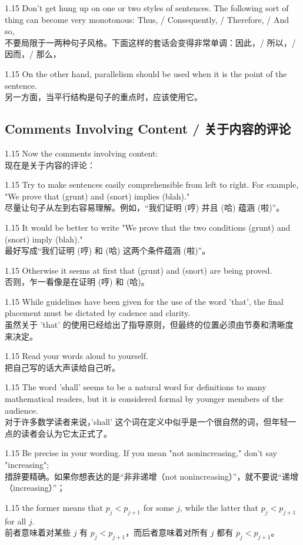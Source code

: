 \documentclass[12pt,a4paper]{article}
\newcommand{\bilingual}[2]{
    \begin{spacing}{1.15} %
        \noindent \normalsize #1 \\[-0.5ex] %
        \small \textcolor{blue!70!black}{#2} %
    \end{spacing}
    \vspace{0.8em} %
}
\begin{document}
\bilingual{Don't get hung up on one or two styles of sentences. The following sort of thing can become very monotonous: Thus, / Consequently, / Therefore, / And so,}
{不要局限于一两种句子风格。下面这样的套话会变得非常单调：因此，/ 所以，/ 因而，/ 那么，} %

\bilingual{On the other hand, parallelism should be used when it is the point of the sentence.}
{另一方面，当平行结构是句子的重点时，应该使用它。} %

\subsection*{Comments Involving Content / 关于内容的评论} %

\bilingual{Now the comments involving content:}
{现在是关于内容的评论：} %

\bilingual{Try to make sentences easily comprehensible from left to right. For example, "We prove that (grunt) and (snort) implies (blah)."}
{尽量让句子从左到右容易理解。例如，“我们证明 (哼) 并且 (哈) 蕴涵 (啦)”。} %

\bilingual{It would be better to write "We prove that the two conditions (grunt) and (snort) imply (blah)."}
{最好写成“我们证明 (哼) 和 (哈) 这两个条件蕴涵 (啦)”。} %

\bilingual{Otherwise it seems at first that (grunt) and (snort) are being proved.}
{否则，乍一看像是在证明 (哼) 和 (哈)。} %

\bilingual{While guidelines have been given for the use of the word 'that', the final placement must be dictated by cadence and clarity.}
{虽然关于 'that' 的使用已经给出了指导原则，但最终的位置必须由节奏和清晰度来决定。} %

\bilingual{Read your words aloud to yourself.}
{把自己写的话大声读给自己听。} %

\bilingual{The word 'shall' seems to be a natural word for definitions to many mathematical readers, but it is considered formal by younger members of the audience.}
{对于许多数学读者来说，'shall' 这个词在定义中似乎是一个很自然的词，但年轻一点的读者会认为它太正式了。} %

\bilingual{Be precise in your wording. If you mean "not nonincreasing," don't say "increasing";}
{措辞要精确。如果你想表达的是“非非递增（not nonincreasing）”，就不要说“递增（increasing）”；} %

\bilingual{the former means that $p_{j}<p_{j+1}$ for some $j$, while the latter that $p_{j}<p_{j+1}$ for all $j$.}
{前者意味着对某些 $j$ 有 $p_{j}<p_{j+1}$，而后者意味着对所有 $j$ 都有 $p_{j}<p_{j+1}$。} %
\end{document}
